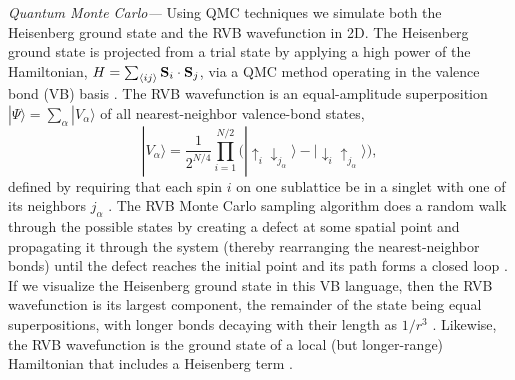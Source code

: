 \documentclass[prl,aps,twocolumn,floatfix,amsmath,amssymb,superscriptaddress,tightenlines]{revtex4}
\begin{document}
{\it Quantum Monte Carlo---}
Using QMC techniques we simulate both the
Heisenberg ground state and the RVB
wavefunction in 2D.  The Heisenberg ground state is
projected from a trial state by applying a high power of the
Hamiltonian, $H = \sum_{\langle ij \rangle} {\bf S}_i \cdot {\bf S}_j$, via a QMC method operating in the valence bond (VB)
basis \cite{Sandvik}. 
The RVB wavefunction 
is an equal-amplitude superposition 
$| \Psi \rangle = \sum_{\alpha} | V_{\alpha} \rangle$
of all nearest-neighbor valence-bond states, 
\begin{equation}
|V_{\alpha} \rangle =  \frac{1}{2^{N/4}} \prod_{i=1}^{N/2} \big( | \uparrow_i \downarrow_{j_{\alpha}} \rangle -  | \downarrow_i  \uparrow_{j_{\alpha}} \rangle \big),
\end{equation}
 defined by requiring that each spin $i$ on one sublattice be in a singlet with one of its neighbors $j_\alpha$ \cite{RVB1,RVB2}. The RVB 
Monte Carlo sampling
algorithm does a random walk through the possible states by creating a
defect at some spatial point and propagating it through the system (thereby
rearranging the nearest-neighbor bonds) until the defect reaches the
initial point and its path forms a closed loop \cite{AWSloop}.
If we visualize the Heisenberg ground state in this VB language, then the RVB wavefunction is its largest component, the remainder of the state being equal superpositions, with longer bonds decaying with their length as $1/r^3$ \cite{Sandvik}.  Likewise, the RVB wavefunction is the ground state of a local (but longer-range) Hamiltonian that includes a Heisenberg term \cite{Cano}.
\end{document}
